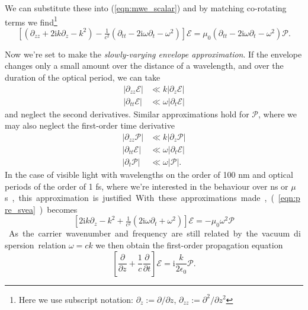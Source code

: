     We can substitute these into (\ref{eqn:mwe_scalar}) and by matching
    co-rotating terms we find\footnote{Here we use subscript notation: $\partial_{z} := \partial/\partial z$, $\partial_{zz} := \partial^2/\partial z^2$ \etc}
    \begin{equation}
    \left[ ( \partial_{zz} + 2 \mathrm{i} k \partial_{z} - k^2 ) - 
      \tfrac{1}{c^2} (\partial_{tt} - 
      2 \mathrm{i} \omega \partial_{t} - \omega^2 ) \right] \mathcal{E} = 
      \mu_0 (\partial_{tt} - 2 \mathrm{i} \omega \partial_{t} - 
      \omega^2) \mathcal{P}.
    \label{eqn:pre_svea}
    \end{equation}

    Now we're set to make the \textit{slowly-varying envelope
    approximation}.\cite{lambropoulos2007fundamentals} If the envelope changes
    only a small amount over the distance of a wavelength, and over the duration
    of the optical period, we can take
    \begin{align*}
    \lvert \partial_{zz} \mathcal{E} \rvert &\ll k \lvert \partial_{z} 
        \mathcal{E} \rvert\\
    \lvert \partial_{tt} \mathcal{E} \rvert &\ll \omega \lvert \partial_{t} 
        \mathcal{E} \rvert
    \end{align*}
    and neglect the second derivatives. Similar approximations hold for
    $\mathcal{P}$, where we may also neglect the first-order time derivative
    \begin{align*}
      \lvert \partial_{zz} \mathcal{P} \rvert &\ll 
        k \lvert \partial_{z} \mathcal{P} \rvert \\
      \lvert \partial_{tt} \mathcal{E} \rvert &\ll 
        \omega \lvert \partial_{t} \mathcal{E} \rvert \\
      \lvert \partial_{t} \mathcal{P} \rvert &\ll 
        \omega \lvert \mathcal{P} \rvert.
    \end{align*}
    In the case of visible light with wavelengths on the order of 100 nm and
    optical periods of the order of 1 fs, where we're interested in the
    behaviour over \unit{ns} or \unit{$\mu$s}, this approximation is justified.

    With these approximations made, (\ref{eqn:pre_svea}) becomes
    \begin{equation}
      \left[ 2 \mathrm{i} k \partial_z - k^2 + \tfrac{1}{c^2} 
      (2 \mathrm{i} \omega \partial_t + \omega^2 ) \right] \mathcal{E} = 
      -\mu_0 \omega^2 \mathcal{P}
    \end{equation}
    As the carrier wavenumber and frequency are still related by the vacuum
    dispersion relation $\omega = c k$ we then obtain the first-order
    propagation equation
    \begin{equation}
      \label{eqn:fo_mwe}
      \left[ \frac{\partial}{\partial z} + \frac{1}{c} 
      \frac{\partial}{\partial t} \right] \mathcal{E} = 
      \mathrm{i} \frac{k}{2 \epsilon_0} \mathcal{P}.
    \end{equation}

